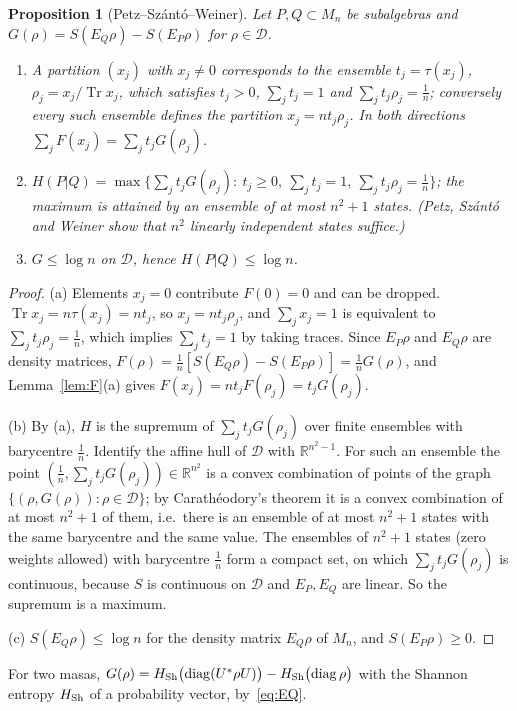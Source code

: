 \documentclass[11pt]{article}
\DeclareMathOperator{\Tr}{Tr}
\DeclareMathOperator{\diag}{diag}
\newcommand{\R}{\mathbb{R}}
\newcommand{\D}{\mathcal{D}}
\theoremstyle{plain}
\newtheorem{proposition}[theorem]{Proposition}
\theoremstyle{definition}
\theoremstyle{remark}
\begin{document}
\begin{proposition}[Petz--Sz\'ant\'o--Weiner]\label{prop:psw}
Let $P,Q\subset M_n$ be subalgebras and $G(\rho)=S(E_Q\rho)-S(E_P\rho)$ for $\rho\in\D$.
\begin{enumerate}
\item[(a)] A partition $(x_j)$ with $x_j\ne0$ corresponds to the ensemble $t_j=\tau(x_j)$, $\rho_j=x_j/\Tr x_j$, which satisfies
$t_j>0$, $\sum_jt_j=1$ and $\sum_jt_j\rho_j=\frac1n$; conversely every such ensemble defines the partition $x_j=nt_j\rho_j$.
In both directions $\sum_jF(x_j)=\sum_jt_jG(\rho_j)$.
\item[(b)] $H(P|Q)=\max\bigl\{\sum_jt_jG(\rho_j):\ t_j\ge0,\ \sum_jt_j=1,\ \sum_jt_j\rho_j=\frac1n\bigr\}$; the maximum is attained by
an ensemble of at most $n^2+1$ states. (Petz, Sz\'ant\'o and Weiner show that $n^2$ linearly independent states suffice.)
\item[(c)] $G\le\log n$ on $\D$, hence $H(P|Q)\le\log n$.
\end{enumerate}
\end{proposition}
\begin{proof}
(a) Elements $x_j=0$ contribute $F(0)=0$ and can be dropped. $\Tr x_j=n\tau(x_j)=nt_j$, so $x_j=nt_j\rho_j$, and $\sum_jx_j=1$ is
equivalent to $\sum_jt_j\rho_j=\frac1n$, which implies $\sum_jt_j=1$ by taking traces. Since $E_P\rho$ and $E_Q\rho$ are density
matrices, $F(\rho)=\frac1n[S(E_Q\rho)-S(E_P\rho)]=\frac1nG(\rho)$, and Lemma~\ref{lem:F}(a) gives $F(x_j)=nt_jF(\rho_j)=t_jG(\rho_j)$.

(b) By (a), $H$ is the supremum of $\sum_jt_jG(\rho_j)$ over finite ensembles with barycentre $\frac1n$. Identify the affine
hull of $\D$ with $\R^{n^2-1}$. For such an ensemble the point $(\frac1n,\sum_jt_jG(\rho_j))\in\R^{n^2}$ is a convex combination of
points of the graph $\{(\rho,G(\rho)):\rho\in\D\}$; by Carath\'eodory's theorem it is a convex combination of at most $n^2+1$
of them, i.e.\ there is an ensemble of at most $n^2+1$ states with the same barycentre and the same value. The ensembles of
$n^2+1$ states (zero weights allowed) with barycentre $\frac1n$ form a compact set, on which $\sum_jt_jG(\rho_j)$ is continuous,
because $S$ is continuous on $\D$ and $E_P,E_Q$ are linear. So the supremum is a maximum.

(c) $S(E_Q\rho)\le\log n$ for the density matrix $E_Q\rho$ of $M_n$, and $S(E_P\rho)\ge0$.
\end{proof}

For two masas, $G(\rho)=H_{\rm Sh}\bigl(\diag(U^*\rho U)\bigr)-H_{\rm Sh}\bigl(\diag\rho\bigr)$ with the Shannon
entropy $H_{\rm Sh}$ of a probability vector, by~\eqref{eq:EQ}.
\end{document}
